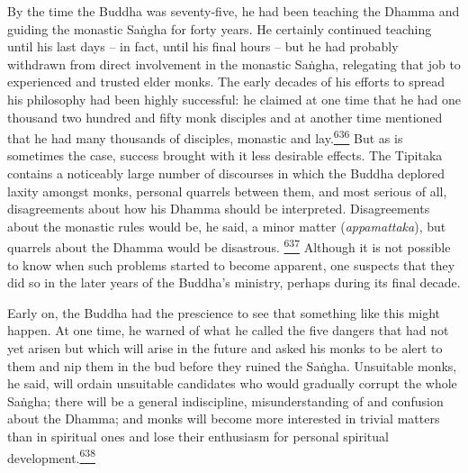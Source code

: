 By the time the Buddha was seventy-five, he had been teaching the Dhamma
and guiding the monastic Saṅgha for forty years. He certainly continued
teaching until his last days -- in fact, until his final hours -- but he
had probably withdrawn from direct involvement in the monastic Saṅgha,
relegating that job to experienced and trusted elder monks. The early
decades of his efforts to spread his philosophy had been highly
successful: he claimed at one time that he had one thousand two hundred
and fifty monk disciples and at another time mentioned that he had many
thousands of disciples, monastic and
lay.\label{footprints_split_016.html_fnref636}\hyperref[footprints_split_025.htmlux5cux23fn636]{\textsuperscript{636}}
But as is sometimes the case, success brought with it less desirable
effects. The Tipitaka contains a noticeably large number of discourses
in which the Buddha deplored laxity amongst monks, personal quarrels
between them, and most serious of all, disagreements about how his
Dhamma should be interpreted. Disagreements about the monastic rules
would be, he said, a minor matter (\emph{appamattaka}), but quarrels
about the Dhamma would be disastrous.
\label{footprints_split_016.html_fnref637}\hyperref[footprints_split_025.htmlux5cux23fn637]{\textsuperscript{637}}
Although it is not possible to know when such problems started to become
apparent, one suspects that they did so in the later years of the
Buddha's ministry, perhaps during its final decade.

Early on, the Buddha had the prescience to see that something like this
might happen. At one time, he warned of what he called the five dangers
that had not yet arisen but which will arise in the future and asked his
monks to be alert to them and nip them in the bud before they ruined the
Saṅgha. Unsuitable monks, he said, will ordain unsuitable candidates who
would gradually corrupt the whole Saṅgha; there will be a general
indiscipline, misunderstanding of and confusion about the Dhamma; and
monks will become more interested in trivial matters than in spiritual
ones and lose their enthusiasm for personal spiritual
development.\label{footprints_split_016.html_fnref638}\hyperref[footprints_split_025.htmlux5cux23fn638]{\textsuperscript{638}}

